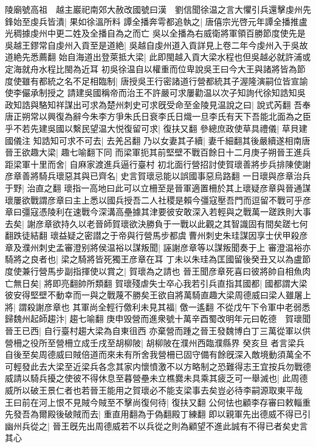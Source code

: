 陵廟號高祖　越主巖祀南郊大赦改國號曰漢　劉信聞徐温之言大懼引兵還擊虔州先鋒始至虔兵皆潰|{
	果如徐溫所料}
譚全播奔雩都追執之|{
	唐僖宗光啓元年譚全播推盧光稠據虔州中更二姓及全播自為之而亡}
吳以全播為右威衛將軍領百勝節度使先是吳越王鏐常自虔州入貢至是道絶|{
	吳越自虔州道入貢詳見上卷二年今虔州入于吳故道絶先悉薦翻}
始自海道出登萊抵大梁|{
	此即閩越入貢大梁水程也但吳越必就許浦或定海就舟水程比閩為近耳}
初吳徐温自以權重而位卑說吳王曰今大王與諸將皆為節度使雖有都統之名不足相臨制|{
	唐授吳王行密諸道行營都統其子渥隆演嗣位皆宣諭使李儼承制授之}
請建吳國稱帝而治王不許嚴可求屢勸温以次子知詢代徐知誥知吳政知誥與駱知祥謀出可求為楚州刺史可求旣受命至金陵見温說之曰|{
	說式芮翻}
吾奉唐正朔常以興復為辭今朱李方爭朱氏日衰李氏日熾一旦李氏有天下吾能北面為之臣乎不若先建吳國以繫民望温大悦復留可求|{
	復扶又翻}
參總庶政使草具禮儀|{
	草貝建國儀注}
知誥知可求不可去|{
	去羌呂翻}
乃以女妻其子續|{
	妻千細翻其後嚴續遂相南唐}
晉王欲趣大梁|{
	趣七喻翻下同}
而梁軍扼其前堅壁不戰百餘日十二月庚子朔晉王進兵距梁軍十里而舍|{
	自麻家渡進兵逼行臺村}
初北面行營招討使賀瓌善將步兵排陳使謝彦章善將騎兵瓌惡其與已齊名|{
	史言賀瓌忌能以誤國事惡烏路翻}
一日瓌與彦章治兵于野|{
	治直之翻}
瓌指一高地曰此可以立柵至是晉軍適置柵於其上瓌疑彦章與晉通謀瓌屢欲戰謂彦章曰主上悉以國兵授吾二人社稷是賴今彊寇壓吾門而逗留不戰可乎彦章曰彊寇憑陵利在速戰今深溝高壘據其津要彼安敢深入若輕與之戰萬一蹉跌則大事去矣|{
	謝彦章欲持久以老晉師賀瓌欲決勝負于一戰以此觀之其智識固有間矣蹉七何翻跌徒結翻}
瓌益疑之密譛之于帝與行營馬步都虞曹州刺史朱珪謀因享士伏甲殺彦章及濮州刺史孟審澄别將侯温裕以謀叛聞|{
	誣謝彦章等以謀叛聞奏于上}
審澄温裕亦騎將之良者也|{
	梁之騎將皆死獨王彦章在耳}
丁未以朱珪為匡國留後癸丑又以為盧節度使兼行營馬步副指揮使以賞之|{
	賀瓌為之請也}
晉王聞彦章死喜曰彼將帥自相魚肉亡無日矣|{
	將即亮翻帥所類翻}
賀瓌殘虐失士卒心我若引兵直指其國都|{
	國都謂大梁}
彼安得堅壁不動幸而一與之戰蔑不勝矣王欲自將萬騎直趣大梁周德威曰梁人雖屠上將|{
	謂殺謝彦章也}
其軍尚全輕行儌利未見其福|{
	儌一遙翻}
不從戊午下令軍中老弱悉歸魏州起師趨汴|{
	趨七喻翻}
庚申毁營而進衆號十萬辛酉蜀改明年元曰乾德　賀瓌聞晉王已西|{
	自行臺村趨大梁為自東徂西}
亦棄營而踵之晉王發魏博白丁三萬從軍以供營柵之役所至營柵立成壬戌至胡柳陂|{
	胡柳陂在濮州西臨濮縣界}
癸亥旦者言梁兵自後至矣周德威曰賊倍道而來未有所舍我營柵已固守備有餘旣深入敵境動須萬全不可輕發此去大梁至近梁兵各念其家内懷憤激不以方略制之恐難得志王宜按兵勿戰德威請以騎兵擾之使彼不得休息至暮營壘未立樵爨未具乘其疲乏可一舉滅也|{
	此周德威所以破王景仁者也若晉王能用之賀瓌必不能支梁事去矣豈必待李嗣源取東平哉}
王曰前在河上恨不見賊今賊至不擊尚復何待|{
	復扶又翻}
公何怯也顧李存審曰敕輜重先發吾為爾殿後破賊而去|{
	重直用翻為于偽翻殿丁練翻}
即以親軍先出德威不得已引幽州兵從之|{
	晉王旣先出周德威若不以兵從之則為顧望不進此誠有不得已者矣史言其心}
